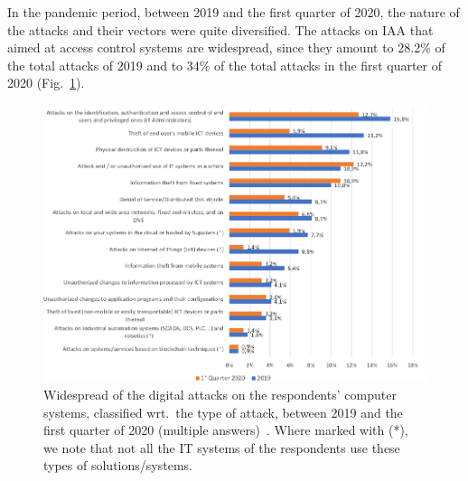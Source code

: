 \documentclass{easychair}
\begin{document}
In the pandemic period, between 2019 and the first quarter of 2020, the nature of the attacks and their vectors were quite diversified.
The attacks on IAA that aimed at access control systems are widespread, since they amount to 28.2\% of the total attacks
of 2019 and to 34\% of the total attacks in the first quarter of 2020 (Fig.~\ref{fig:5}).

\begin{figure}
  \centering
  \includegraphics[width=1\textwidth]{pictures/fig5.png}
  \caption{Widespread of the digital attacks on the respondents' computer systems, classified wrt.\ the type of attack, between 2019 and the first quarter of 2020 (multiple answers)~\cite{oad20}. Where marked with (*), we note that not all the IT systems of the respondents use these types of solutions/systems.}
  \label{fig:5}
\end{figure}
\end{document}
